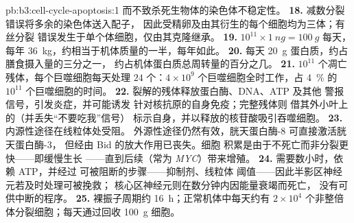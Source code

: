 \begin{solution}{pb:b3:cell-cycle-apoptosis:1}
而不致杀死生物体的染色体不稳定性。
\textbf{18.} 减数分裂错误将多余的染色体送入配子，
因此受精卵及由其衍生的每个细胞均为三体；有丝分裂
错误发生于单个体细胞，仅由其克隆继承。
\textbf{19.} $10^{11}\times \qty{1}{ng} = \qty{100}{g}$ 每天，
每年 \qty{36}{kg}，约相当于机体质量的一半，每年如此。
\textbf{20.} 每天 \qty{20}{g} 蛋白质，约占膳食摄入量的三分之一，
约占机体蛋白质总周转量的百分之几。
\textbf{21.} $10^{11}$ 个凋亡残体，每个巨噬细胞每天处理 $24$ 个：$4\times
10^{9}$ 个巨噬细胞全时工作，占 \qty{4}{\%} 的 $10^{11}$
个巨噬细胞的时间。
\textbf{22.} 裂解的残体释放蛋白酶、DNA、ATP 及其他
警报信号，引发炎症，并可能诱发
针对核抗原的自身免疫；完整残体则
借其外小叶上的（并丢失“不要吃我”信号）
标示自身，并以释放的核苷酸吸引吞噬细胞。
\textbf{23.} 内源性途径在线粒体处受阻。
外源性途径仍然有效，胱天蛋白酶-8 可直接激活胱天蛋白酶-3，
但经由 Bid 的放大作用已丧失。细胞
积累是由于不死亡而非分裂更快——即缓慢生长
——直到后续（常为 \emph{MYC}）带来增殖。
\textbf{24.} 需要数小时，依赖 ATP，并经过
可被阻断的步骤——抑制剂、线粒体
阈值——因此半影区神经元若及时处理可被挽救；
核心区神经元则在数分钟内因能量衰竭而死亡，
没有可供中断的程序。
\textbf{25.} 裸振子周期约 \qty{16}{h}；正常机体中每天约有 $2\times
10^{4}$ 个非整倍体分裂细胞；每天通过回收
\qty{100}{g} 细胞。
\end{solution}
